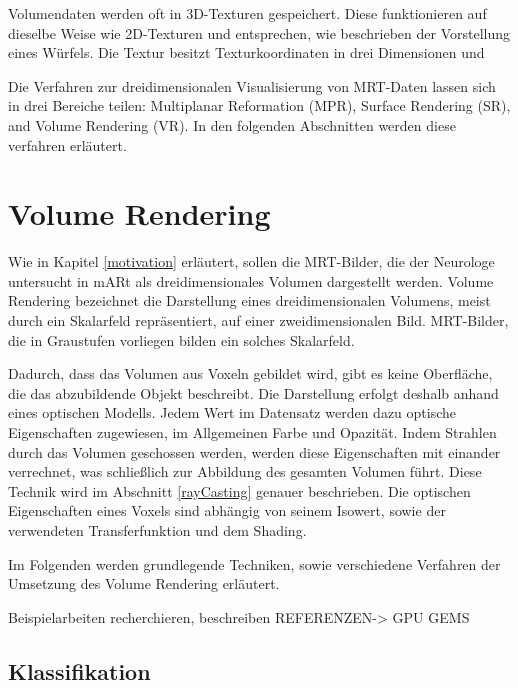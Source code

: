 Volumendaten werden oft in 3D-Texturen gespeichert. Diese funktionieren auf dieselbe Weise wie 2D-Texturen und entsprechen, wie beschrieben der Vorstellung eines Würfels. Die Textur besitzt Texturkoordinaten in drei Dimensionen und 

Die Verfahren zur dreidimensionalen Visualisierung von MRT-Daten lassen sich in drei Bereiche teilen: Multiplanar Reformation (MPR), Surface Rendering (SR), and Volume Rendering (VR). \cite{Zhang10} In den folgenden Abschnitten werden diese verfahren erläutert.

\section{Volume Rendering}							  %
Wie in Kapitel \ref{motivation} erläutert, sollen die MRT-Bilder, die der Neurologe untersucht in mARt als dreidimensionales Volumen dargestellt werden. Volume Rendering bezeichnet die Darstellung eines dreidimensionalen Volumens, meist durch ein Skalarfeld repräsentiert, auf einer zweidimensionalen Bild. MRT-Bilder, die in Graustufen vorliegen bilden ein solches Skalarfeld. 

Dadurch, dass das Volumen aus Voxeln gebildet wird, gibt es keine Oberfläche, die das abzubildende Objekt beschreibt. Die Darstellung erfolgt deshalb anhand eines optischen Modells. Jedem Wert im Datensatz werden dazu optische Eigenschaften zugewiesen, im Allgemeinen Farbe und Opazität. Indem Strahlen durch das Volumen geschossen werden, werden diese Eigenschaften mit einander verrechnet, was schließlich zur Abbildung des gesamten Volumen führt. Diese Technik wird im Abschnitt \ref{rayCasting} genauer beschrieben.
Die optischen Eigenschaften eines Voxels sind abhängig von seinem Isowert, sowie der verwendeten Transferfunktion und dem Shading. 

Im Folgenden werden grundlegende Techniken, sowie verschiedene Verfahren der Umsetzung des Volume Rendering erläutert.

\cite{Kaufman03}
\cite{kniss02}
Beispielarbeiten recherchieren, beschreiben
REFERENZEN-> GPU GEMS

\subsection{Klassifikation}

